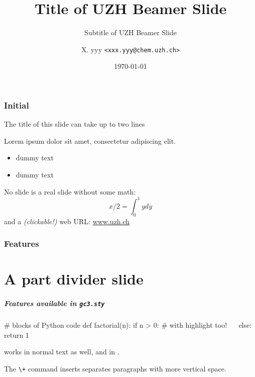 \documentclass[english,serif,mathserif,usenames,dvipsnames]{beamer}
\begin{document}
\title[UZH Beamer Slide]{Title of UZH Beamer Slide}
\subtitle{Subtitle of UZH Beamer Slide}
\author{X. yyy \texttt{<xxx.yyy@chem.uzh.ch>}}
\date{\today}

\maketitle

\section{Initial}
\begin{frame}{The title of this slide can take up to two lines}

  Lorem ipsum dolor sit amet, consectetur adipiscing elit.
  \begin{itemize}
  \item dummy text
  \item dummy text
  \end{itemize}

  No slide is a real slide without some math:
  $$x/2 = \int_{0}^{1} ydy$$
  and a \emph{(clickable!)} web URL: \url{www.uzh.ch}

\end{frame}

\section{Features}
\part{A part divider slide}

\begin{frame}
  \frametitle{Features available in \texttt{gc3.sty}}

  \begin{python}
# blocks of Python code
def factorial(n):
  if n > 0:
    # with highlight too!
    ~~
  else:
    return 1
  \end{python}

  \+
   works in normal text as well, and
  in  .

  \+
  The \lstinline|\+| command inserts separates paragraphs with more
  vertical space.
\end{frame}
\end{document}
